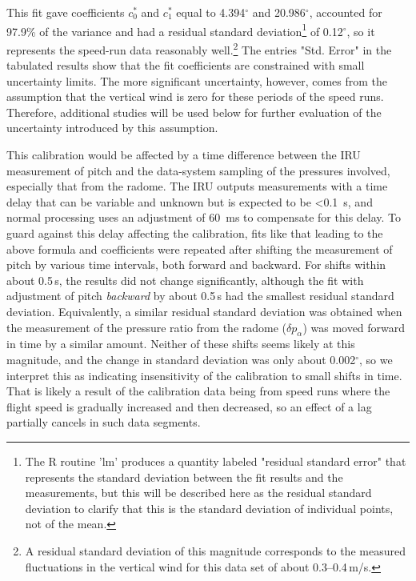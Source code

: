 \documentclass[12pt,twoside,english]{article}\usepackage[]{graphicx}\usepackage[]{color}
\let\OrgIndex\index
\renewcommand*{\index}[1]{\OrgIndex{#1}}
\begin{document}
This fit gave coefficients $c_{0}^{*}$ and $c_{1}^{*}$ equal to  
4.394$^{\circ}$ and 20.986$^{\circ}$,  
accounted for 97.9\% of the variance and had a residual standard deviation\footnote{The R routine 'lm' produces a quantity labeled "residual standard error" that represents the standard deviation between the fit results and the measurements, but this will be described here as the residual standard deviation to clarify that this is the standard deviation of individual points, not of the mean.} of 0.12$^{\circ}$, so it represents the speed-run data reasonably well.\footnote{A residual standard deviation of this magnitude corresponds to the measured fluctuations
in the vertical wind for this data set of about 0.3--0.4\,m/s.} 
The entries "Std. Error" in the tabulated results show that the fit coefficients are constrained with small uncertainty limits. 
The more significant uncertainty,
however, comes from the assumption that the vertical wind is zero
for these periods of the speed runs. Therefore, additional studies
will be used below for further evaluation of the uncertainty introduced
by this assumption.

This calibration would be affected by a time difference between the IRU measurement of pitch and the data-system sampling of the pressures involved, especially that from the radome. The IRU outputs measurements with a time delay that can be variable and unknown but is expected to be <0.1~s, and normal processing uses an adjustment of 60~ms to compensate for this delay. To guard against this delay affecting the calibration, fits like that leading to the above formula and coefficients were repeated after shifting the measurement of pitch by various time intervals, both forward and backward. For shifts within about 0.5\,s, the results did not change significantly, although the fit with adjustment of pitch \emph{backward} by about 0.5\,s had the smallest residual standard deviation. Equivalently, a similar residual standard deviation was obtained when the measurement of the pressure ratio from the radome ($\delta p_{\alpha}$) was moved forward in time by a similar amount. Neither of these shifts seems likely at this magnitude, and the change in standard deviation was only about 0.002$^{\circ}$, so we interpret this as indicating insensitivity of the calibration to small shifts in time. That is likely a result of the calibration data being from speed runs where the flight speed is gradually increased and then decreased, so an effect of a lag partially cancels in such data segments. 
\end{document}
